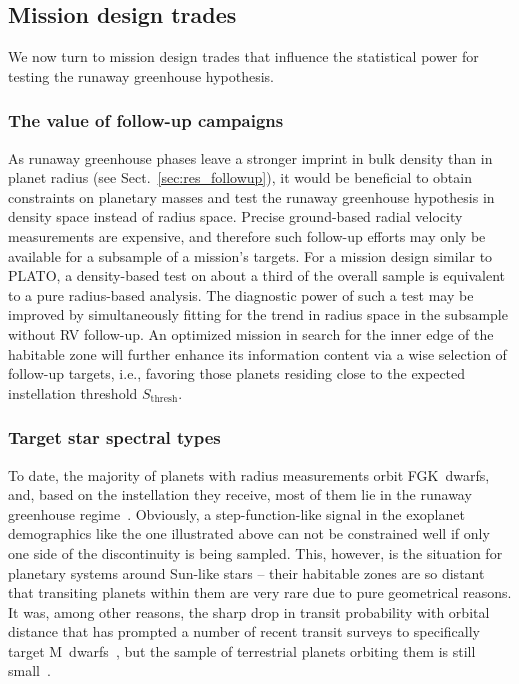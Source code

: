 \documentclass[modern]{aastex631}
\begin{document}
\subsection{Mission design trades}\label{sec:mission-design-trades}
We now turn to mission design trades that influence the statistical power for testing the runaway greenhouse hypothesis.

\subsubsection{The value of follow-up campaigns}
\begin{note}
As runaway greenhouse phases leave a stronger imprint in bulk density than in planet radius (see Sect.~\ref{sec:res_followup}), it would be beneficial to obtain constraints on planetary masses and test the runaway greenhouse hypothesis in density space instead of radius space.
Precise ground-based radial velocity measurements are expensive, and therefore such follow-up efforts may only be available for a subsample of a mission's targets.
For a mission design similar to PLATO, a density-based test on about a third of the overall sample is equivalent to a pure radius-based analysis.
The diagnostic power of such a test may be improved by simultaneously fitting for the trend in radius space in the subsample without RV follow-up.
An optimized mission in search for the inner edge of the habitable zone will further enhance its information content via a wise selection of follow-up targets, i.e., favoring those planets residing close to the expected instellation threshold $S_\mathrm{thresh}$.
\end{note}

\subsubsection{Target star spectral types}
To date, the majority of planets with radius measurements orbit FGK~dwarfs, and, based on the instellation they receive, most of them lie in the runaway greenhouse regime~\citep{Thompson2018}.
Obviously, a step-function-like signal in the exoplanet demographics like the one illustrated above can not be constrained well if only one side of the discontinuity is being sampled.
This, however, is the situation for planetary systems around Sun-like stars -- their habitable zones are so distant that transiting planets within them are very rare due to pure geometrical reasons.
It was, among other reasons, the sharp drop in transit probability with orbital distance that has prompted a number of recent transit surveys to specifically target M~dwarfs~\citep[e.g.,][]{Irwin2009,Obermeier2016,Delrez2018,Sebastian2021,Dietrich2023}, but the sample of terrestrial planets orbiting them is still small~\citep[e.g.,][]{Berger2020,Hardegree-Ullman2020a}.
\end{document}
